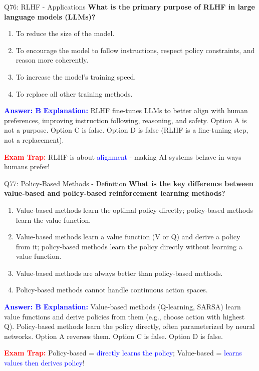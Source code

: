 \documentclass[8pt]{beamer}
\begin{document}
	\begin{frame}{Q76: RLHF - Applications}
		\fontsize{6.5}{7.5}\selectfont
		\textbf{What is the primary purpose of RLHF in large language models (LLMs)?}
		
		\begin{enumerate}
			\item To reduce the size of the model.
			\item To encourage the model to follow instructions, respect policy constraints, and reason more coherently.
			\item To increase the model's training speed.
			\item To replace all other training methods.
		\end{enumerate}
		
		\vspace{0.1cm}
		\textcolor{blue}{\textbf{Answer: B}}
		\vspace{0.1cm}
		\textcolor{blue}{\textbf{Explanation:}} RLHF fine-tunes LLMs to better align with human preferences, improving instruction following, reasoning, and safety. Option A is not a purpose. Option C is false. Option D is false (RLHF is a fine-tuning step, not a replacement).
		
		\textcolor{red}{\textbf{Exam Trap:}} RLHF is about \textcolor{blue}{alignment} - making AI systems behave in ways humans prefer!
	\end{frame}
	
	\begin{frame}{Q77: Policy-Based Methods - Definition}
		\fontsize{6.5}{7.5}\selectfont
		\textbf{What is the key difference between value-based and policy-based reinforcement learning methods?}
		
		\begin{enumerate}
			\item Value-based methods learn the optimal policy directly; policy-based methods learn the value function.
			\item Value-based methods learn a value function (V or Q) and derive a policy from it; policy-based methods learn the policy directly without learning a value function.
			\item Value-based methods are always better than policy-based methods.
			\item Policy-based methods cannot handle continuous action spaces.
		\end{enumerate}
		
		\vspace{0.1cm}
		\textcolor{blue}{\textbf{Answer: B}}
		\vspace{0.1cm}
		\textcolor{blue}{\textbf{Explanation:}} Value-based methods (Q-learning, SARSA) learn value functions and derive policies from them (e.g., choose action with highest Q). Policy-based methods learn the policy directly, often parameterized by neural networks. Option A reverses them. Option C is false. Option D is false.
		
		\textcolor{red}{\textbf{Exam Trap:}} Policy-based = \textcolor{blue}{directly learns the policy}; Value-based = \textcolor{blue}{learns values then derives policy}!
	\end{frame}
	
\end{document}
